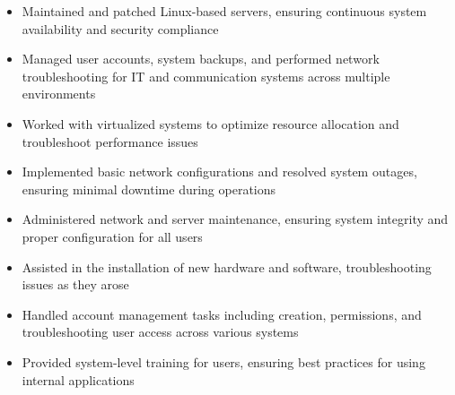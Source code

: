 \par\bigskip
{}
\par\smallskip
\begin{minipage}{13.75cm}
  \begin{minipage}{6.5cm}
    \begin{itemize}
      \item Maintained and patched Linux-based servers, ensuring continuous system availability and security compliance
      \item Managed user accounts, system backups, and performed network troubleshooting for IT and communication systems across multiple environments
    \end{itemize}
  \end{minipage}
  \hfill
  \begin{minipage}{6.5cm}
    \begin{itemize}
      \item Worked with virtualized systems to optimize resource allocation and troubleshoot performance issues
      \item Implemented basic network configurations and resolved system outages, ensuring minimal downtime during operations
    \end{itemize}
  \end{minipage}
\end{minipage}
\par\smallskip
\divider

\par\smallskip
\begin{minipage}{13.75cm}
  \begin{minipage}{6.5cm}
    \begin{itemize}
      \item Administered network and server maintenance, ensuring system integrity and proper configuration for all users
      \item Assisted in the installation of new hardware and software, troubleshooting issues as they arose
    \end{itemize}
  \end{minipage}
  \hfill
  \begin{minipage}{6.5cm}
    \begin{itemize}
      \item Handled account management tasks including creation, permissions, and troubleshooting user access across various systems
      \item Provided system-level training for users, ensuring best practices for using internal applications
    \end{itemize}
  \end{minipage}
\end{minipage}

